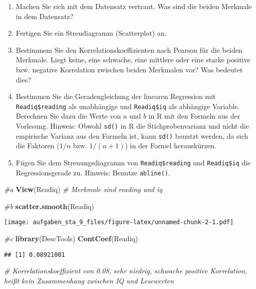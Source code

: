 \documentclass[
]{article}
\newenvironment{Shaded}{\begin{snugshade}}{\end{snugshade}}
\newcommand{\CommentTok}[1]{\textcolor[rgb]{0.56,0.35,0.01}{\textit{#1}}}
\newcommand{\FunctionTok}[1]{\textcolor[rgb]{0.13,0.29,0.53}{\textbf{#1}}}
\newcommand{\NormalTok}[1]{#1}
\providecommand{\tightlist}{%
  \setlength{\itemsep}{0pt}\setlength{\parskip}{0pt}}
\begin{document}
\begin{enumerate}
\def\labelenumi{\alph{enumi})}
\tightlist
\item
  Machen Sie sich mit dem Datensatz vertraut. Was sind die beiden
  Merkmale in dem Datensatz?
\item
  Fertigen Sie ein Streudiagramm (Scatterplot) an.
\item
  Bestimmem Sie den Korrelationskoeffizienten nach Pearson für die
  beiden Merkmale. Liegt keine, eine schwache, eine mittlere oder eine
  starke positive bzw. negative Korrelation zwischen beiden Merkmalen
  vor? Was bedeutet dies?
\item
  Bestimmen Sie die Geradengleichung der linearen Regression mit
  \texttt{Readiq\$reading} als unabhängige und \texttt{Readiq\$iq} als
  abhängige Variable. Berechnen Sie dazu die Werte von \(a\) und \(b\)
  in R mit den Formeln aus der Vorlesung. Hinweis: Obwohl \texttt{sd()}
  in R die Stichprobenvarianz und nicht die empirische Varianz aus den
  Formeln ist, kann \texttt{sd()} benutzt werden, da sich die Faktoren
  (\(1/n\) bzw. \(1/(n+1)\)) in der Formel herauskürzen.
\item
  Fügen Sie dem Streuungsdiagramm von \texttt{Readiq\$reading} und
  \texttt{Readiq\$iq} die Regressionsgerade zu. Hinweis: Benutze
  \texttt{abline()}.
\end{enumerate}

\begin{Shaded}
\begin{Highlighting}[]
\CommentTok{\#a}
\FunctionTok{View}\NormalTok{(Readiq)}
\CommentTok{\# Merkmale sind reading und iq}

\CommentTok{\#b}
\FunctionTok{scatter.smooth}\NormalTok{(Readiq)}
\end{Highlighting}
\end{Shaded}

\texttt{[image: aufgaben\_sta\_9\_files/figure-latex/unnamed-chunk-2-1.pdf]}

\begin{Shaded}
\begin{Highlighting}[]
\CommentTok{\#c}
\FunctionTok{library}\NormalTok{(DescTools)}
\FunctionTok{ContCoef}\NormalTok{(Readiq)}
\end{Highlighting}
\end{Shaded}

\begin{verbatim}
## [1] 0.08921001
\end{verbatim}

\begin{Shaded}
\begin{Highlighting}[]
\CommentTok{\# Korrelationskoeffizient von 0.08, sehr niedrig, schwache positive Korrelation, heißt kein Zusammenhang zwischen IQ und Lesewerten}
\end{Highlighting}
\end{Shaded}
\end{document}
